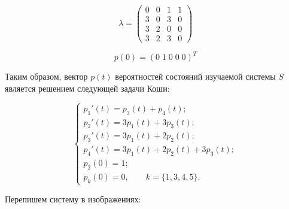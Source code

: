 \documentclass[14pt,a4paper]{scrartcl}
\begin{document}
\begin{figure}[H]
	\begin{minipage}[h]{1\linewidth}
		  \\
	\end{minipage}
\end{figure}

\begin{equation*}
\lambda = 
	\begin{pmatrix}
	0 & 0 & 1 & 1 \\
	3 & 0 & 3 & 0 \\
	3 & 2 & 0 & 0 \\
	3 & 2 & 3 & 0
	\end{pmatrix}
\end{equation*}
	
\begin{equation*}
	p(0) = (0 \; 1 \; 0 \; 0 \; 0)^T
\end{equation*}

Таким образом, вектор $p(t)$ вероятностей состояний изучаемой системы $S$ является решением следующей задачи Коши:

\begin{equation*}
	\begin{cases}
		p_1'(t) = p_3(t) + p_4(t);\\
		p_2'(t) = 3p_1(t) + 3p_3(t);\\
		p_3'(t) = 3p_1(t) + 2p_2(t);\\
		p_4'(t) = 3p_1(t) + 2p_2(t) + 3p_3(t);\\
		
		p_2(0) = 1;\\
		p_k(0) = 0, \qquad k = \{1,3,4,5\}.
	\end{cases}
\end{equation*}


Перепишем систему в изображениях:
\end{document}
